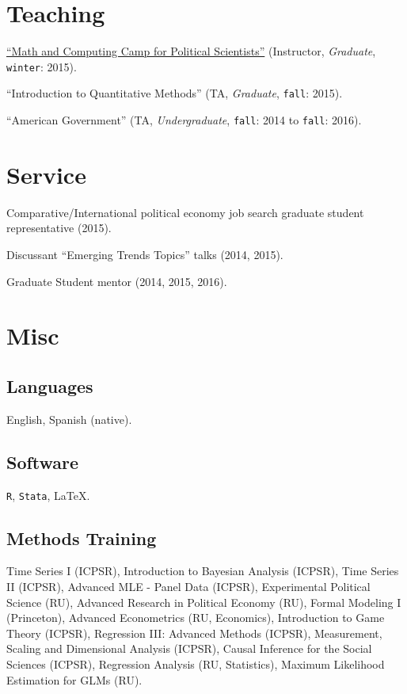 \documentclass[letterpaper]{article}
\renewenvironment{itemize}{
  \begin{list}{}{
    \setlength{\leftmargin}{1.5em}
  }
}{
  \end{list}
}
\begin{document}
\section*{Teaching}

\begin{itemize}
\item \href{http://github.com/hbahamonde/Math-Camp/raw/master/Syllabus/Math_Camp_Syllabus.pdf/}{``Math and Computing Camp for Political Scientists''} (Instructor, \emph{Graduate}, \texttt{winter}: 2015).
\item ``Introduction to Quantitative Methods'' (TA, \emph{Graduate}, \texttt{fall}: 2015).
\item ``American Government'' (TA, \emph{Undergraduate}, \texttt{fall}: 2014 to \texttt{fall}: 2016).
\end{itemize}


\section*{Service}

\begin{itemize}
\item Comparative/International political economy job search graduate student representative (2015).
\item Discussant ``Emerging Trends Topics'' talks (2014, 2015).
\item Graduate Student mentor (2014, 2015, 2016).
\end{itemize}


\section*{Misc}

\subsection*{Languages}
English, Spanish (native).


\subsection*{Software}
\texttt{R}, \texttt{Stata}, \LaTeX.

\subsection*{Methods Training}
Time Series I (ICPSR), Introduction to Bayesian Analysis (ICPSR), Time Series II (ICPSR), Advanced MLE - Panel Data (ICPSR), Experimental Political Science (RU), Advanced Research in Political Economy (RU), Formal Modeling I (Princeton), Advanced Econometrics (RU, Economics), Introduction to Game Theory (ICPSR), Regression III: Advanced Methods (ICPSR), Measurement, Scaling and Dimensional Analysis (ICPSR), Causal Inference for the Social Sciences (ICPSR), Regression Analysis (RU, Statistics), Maximum Likelihood Estimation for GLMs (RU).




\bigskip
\end{document}
